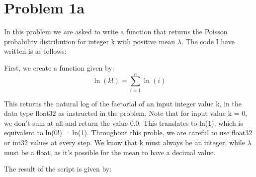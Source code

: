\section{Problem 1a}

In this problem we are asked to write a function that returns the Poisson probability distribution for integer k with positive mean $\lambda$. The code I have written is as follows: 



First, we create a function given by:\\

\begin{equation}
	\ln(k!) = \sum_{i=1}^{n} \ln(i)
\end{equation}

This returns the natural log of the factorial of an input integer value k, in the data type float32 as instructed in the problem. Note that for input value k = 0, we don't sum at all and return the value 0.0. This translates to ln(1), which is equivalent to ln(0!) = ln(1). Throughout this proble, we are careful to use float32 or int32 values at every step. We know that k must always be an integer, while $\lambda$ must be a float, as it's possible for the mean to have a decimal value. 

The result of the script is given by:

